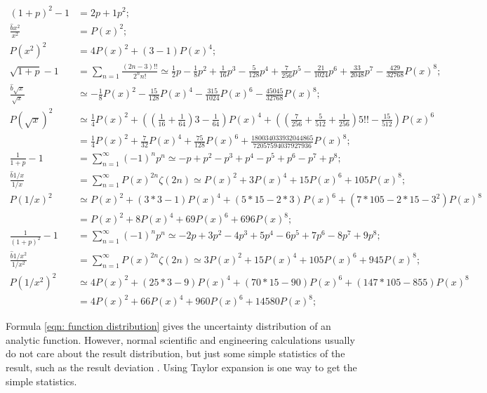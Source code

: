 \documentclass[twoside]{article}
\numberwithin{equation}{section}
\begin{document}
\begin{align*}
(1 + p)^2 - 1 &= 2p + 1p^2; \\
\frac{\hat{b} x^2}{x^2} &= P(x)^2; \\
P(x^2)^2 &= 4 P(x)^2 + (3 - 1) P(x)^4; \\
\sqrt{1 + p} - 1 & = \sum_{n=1} \frac{(2n-3)!!}{2^n n!}
 \simeq \frac{1}{2} p - \frac{1}{8} p^2 + \frac{1}{16} p^3 - \frac{5}{128} p^4 + \frac{7}{256} p^5 - \frac{21}{1024} p^6 + \frac{33}{2048} p^7 - \frac{429}{32768} P(x)^8; \\
\frac{\hat{b} \sqrt{x}}{\sqrt{x}} &\simeq - \frac{1}{8} P(x)^2 - \frac{15}{128} P(x)^4 - \frac{315}{1024} P(x)^6 - \frac{45045}{32768} P(x)^8; \\
P(\sqrt{x})^2 &\simeq \frac{1}{4} P(x)^2
  + ((\frac{1}{16} + \frac{1}{64}) 3 - \frac{1}{64}) P(x)^4
  + ((\frac{7}{256} + \frac{5}{512} + \frac{1}{256}) 5!! - \frac{15}{512}) P(x)^6 \\
 &= \frac{1}{4} P(x)^2 + \frac{7}{32} P(x)^4 + \frac{75}{128} P(x)^6 + \frac{180034033932044865}{72057594037927936} P(x)^8; \\
\frac{1}{1 + p} - 1 & = \sum_{n=1}^{\infty} (-1)^n p^n \simeq -p + p^2 - p^3 + p^4 - p^5 + p^6 - p^7 + p^8; \\
\frac{\hat{b} 1/x}{1/x} & = \sum_{n=1}^{\infty} P(x)^{2n} \zeta(2n) \simeq P(x)^2 + 3 P(x)^4 + 15 P(x)^6 + 105 P(x)^8; \\
P(1/x)^2 &\simeq P(x)^2 + (3 * 3 - 1) P(x)^4 + (5 * 15 - 2 * 3) P(x)^6 + (7 * 105 - 2 * 15 - 3^2) P(x)^8 \\
 &= P(x)^2 + 8 P(x)^4 + 69 P(x)^6 + 696 P(x)^8; \\
\frac{1}{(1 + p)^2} - 1 & = \sum_{n=1}^{\infty} (-1)^n p^n \simeq -2 p + 3 p^2 - 4 p^3 + 5 p^4 - 6 p^5 + 7 p^6 - 8 p^7 + 9 p^8; \\
\frac{\hat{b} 1/x^2}{1/x^2} & = \sum_{n=1}^{\infty} P(x)^{2n} \zeta(2n) \simeq 3 P(x)^2 + 15 P(x)^4 + 105 P(x)^6 + 945 P(x)^8; \\
P(1/x^2)^2 &\simeq 4 P(x)^2 + (25 * 3 - 9) P(x)^4 + (70 * 15 - 90) P(x)^6 + (147 * 105 - 855) P(x)^8 \\
 &= 4 P(x)^2 + 66 P(x)^4 + 960 P(x)^6 + 14580 P(x)^8;
\end{align*}

\fi




Formula \eqref{eqn: function distribution} gives the uncertainty distribution of an analytic function.
However, normal scientific and engineering calculations usually do not care about the result distribution, but just some simple statistics of the result, such as the result deviation \cite{Statistical_Methods} \cite{Precisions_Physical_Measurements}.
Using Taylor expansion is one way to get the simple statistics.
\end{document}
